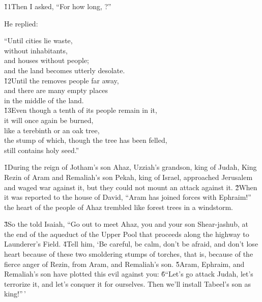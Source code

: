 \v{11}Then I asked, ``For how long, ?''

He replied:

\begin{poetry}
\poeml ``Until cities lie waste, \\
\poemll    without inhabitants, \\
\poeml and houses without people; \\
\poemll    and the land becomes utterly desolate. \\
\poeml \v{12}Until the  removes people far away, \\
\poemll    and there are many empty places \\
\poemlll       in the middle of the land. \\
\poeml \v{13}Even though a tenth of its people remain in it, \\
\poemll    it will once again be burned, \\
\poeml like a terebinth or an oak tree, \\
\poemll    the stump of which, though the tree has been felled, \\
\poemlll       still contains holy seed.''
\end{poetry}

\v{1}During the reign of Jotham's son Ahaz, Uzziah's grandson, king of Judah, King Rezin of Aram and Remaliah's son Pekah, king of Israel, approached Jerusalem and waged war against it, but they could not mount an attack against it. \v{2}When it was reported to the house of David, ``Aram has joined forces with Ephraim!'' the heart of the people of Ahaz trembled like forest trees in a windstorm.

\v{3}So the  told Isaiah, ``Go out to meet Ahaz, you and your son Shear-jashub, at the end of the aqueduct of the Upper Pool that proceeds along the highway to Launderer's Field. \v{4}Tell him, `Be careful, be calm, don't be afraid, and don't lose heart because of these two smoldering stumps of torches, that is, because of the fierce anger of Rezin, from Aram, and Remaliah's son. \v{5}Aram, Ephraim, and Remaliah's son have plotted this evil against you: \v{6}``Let's go attack Judah, let's terrorize it, and let's conquer it for ourselves. Then we'll install Tabeel's son as king!''\,'

